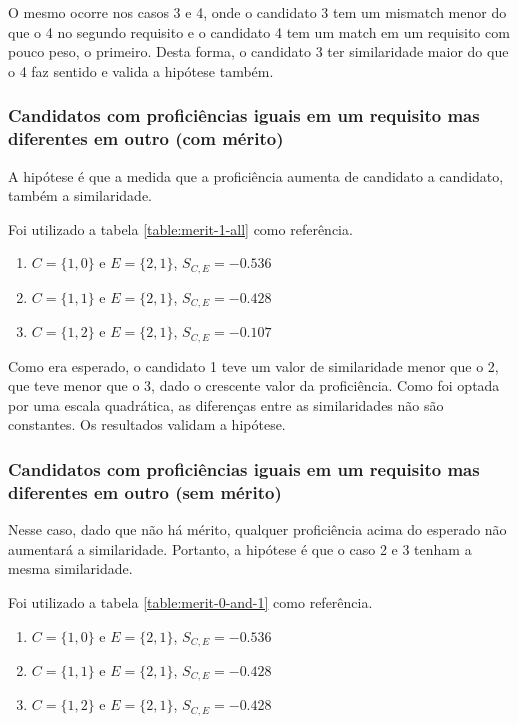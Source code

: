 \documentclass[preprint,12pt]{elsarticle}
\begin{document}
O mesmo ocorre nos casos 3 e 4, onde o candidato 3 tem um mismatch menor do que o 4 no segundo requisito e o candidato 4 tem um match em um requisito com pouco peso, o primeiro. Desta forma, o candidato 3 ter similaridade maior do que o 4 faz sentido e valida a hipótese também.

\subsubsection{Candidatos com proficiências iguais em um requisito mas diferentes em outro (com mérito)}

A hipótese é que a medida que a proficiência aumenta de candidato a candidato, também a similaridade.

Foi utilizado a tabela \ref{table:merit-1-all} como referência.

\begin{enumerate}
    \item $C = \{1,0\}$ e $E = \{2,1\}$, $S_{C,E} = -0.536$
    \item $C = \{1,1\}$ e $E = \{2,1\}$, $S_{C,E} = -0.428$
    \item $C = \{1,2\}$ e $E = \{2,1\}$, $S_{C,E} = -0.107$
\end{enumerate}

Como era esperado, o candidato 1 teve um valor de similaridade menor que o 2, que teve menor que o 3, dado o crescente valor da proficiência. Como foi optada por uma escala quadrática, as diferenças entre as similaridades não são constantes. Os resultados validam a hipótese.

\subsubsection{Candidatos com proficiências iguais em um requisito mas diferentes em outro (sem mérito)}

Nesse caso, dado que não há mérito, qualquer proficiência acima do esperado não aumentará a similaridade. Portanto, a hipótese é que o caso 2 e 3 tenham a mesma similaridade.

Foi utilizado a tabela \ref{table:merit-0-and-1} como referência.

\begin{enumerate}
    \item $C = \{1,0\}$ e $E = \{2,1\}$, $S_{C,E} = -0.536$
    \item $C = \{1,1\}$ e $E = \{2,1\}$, $S_{C,E} = -0.428$
    \item $C = \{1,2\}$ e $E = \{2,1\}$, $S_{C,E} = -0.428$
\end{enumerate}
\end{document}

